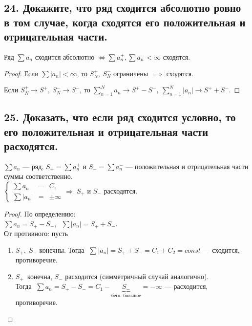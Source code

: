 \documentclass[a4paper, fleqn]{article}
\begin{document}
    \subsection*{24. Докажите, что ряд сходится абсолютно ровно в том случае, когда сходятся его положительная и отрицательная части.}
    \begin{proposition}
        Ряд $\sum a_n$ сходится абсолютно $\iff \sum a_n^+, \sum a_n^- < \infty$ сходятся. 
    \end{proposition}
    \begin{proof}
        Если $\sum \left|a_n\right| < \infty$, то $S_N^+,\ S_N^-$ ограничены $\implies$ сходятся.

        Если $S_N^+ \to S^+,\ S_N^- \to S^-$, то $\sum_{n=1}^N a_n \to S^+ - S^-,\ \sum_{n=1}^N \left|a_n\right| \to S^+ + S^-$.
    \end{proof}
        
    \subsection*{25. Доказать, что если ряд сходится условно, то его положительная и отрицательная части расходятся.}
	$\sum a_n$ --- ряд, $S_{+} = \sum a_n^{+}$ и $S_{-} = \sum a_n^{-}$
	 --- положительная и отрицательная части суммы соответственно. \\[3 pt]
	 $\left\{\begin{array}{lll} 
	 \sum a_n &=& C,\\[5 pt]
	 \sum |a_n| &=& \pm \infty
	 \end{array}\right. \Rightarrow \; S_{+}$ и $S_{-}$ расходятся.
	\begin{proof}
	По определению: \\[3 pt]
	$\sum a_n = S_{+} - S_{-}, \;\; \sum |a_n| = S_{+} + S_{-}$. \\[3 pt]
	От противного: пусть\\[-20 pt]
	\begin{enumerate}
	\item $S_{+}, \; S_{-}$ конечны. Тогда $\;\sum |a_n| = S_{+} + S_{-} = C_1 + C_2 = const$ --- сходится, противоречие.
	\item $S_{+} \, $ конечна, $S_{-}$ расходится (симметричный случай аналогично). \\[0 pt]
	Тогда $\; \sum a_n = S_{+} - S_{-} = C_1 - \underbrace{S_{-}}_{\text{беск. большое}} = -\infty$ --- расходится, противоречие.
	\end{enumerate}
	\end{proof}    
        
\end{document}
